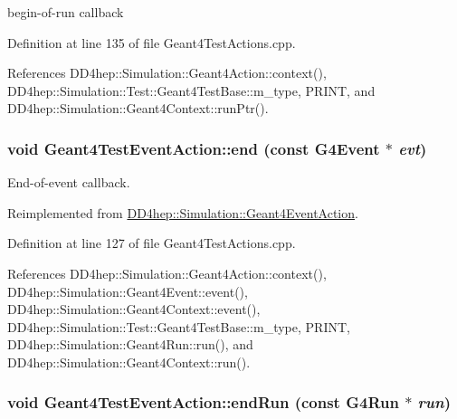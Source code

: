 begin-\/of-\/run callback 

Definition at line 135 of file Geant4TestActions.cpp.

References DD4hep::Simulation::Geant4Action::context(), DD4hep::Simulation::Test::Geant4TestBase::m\_\-type, PRINT, and DD4hep::Simulation::Geant4Context::runPtr().\hypertarget{class_d_d4hep_1_1_simulation_1_1_test_1_1_geant4_test_event_action_a1b436d5b8c7b3f9fa93bc2b04946cad3}{
\subsubsection[{end}]{\setlength{\rightskip}{0pt plus 5cm}void Geant4TestEventAction::end (const G4Event $\ast$ {\em evt})}}
\label{class_d_d4hep_1_1_simulation_1_1_test_1_1_geant4_test_event_action_a1b436d5b8c7b3f9fa93bc2b04946cad3}


End-\/of-\/event callback. 

Reimplemented from \hyperlink{class_d_d4hep_1_1_simulation_1_1_geant4_event_action_af131bad73c28da3419af7c29e0b8c250}{DD4hep::Simulation::Geant4EventAction}.

Definition at line 127 of file Geant4TestActions.cpp.

References DD4hep::Simulation::Geant4Action::context(), DD4hep::Simulation::Geant4Event::event(), DD4hep::Simulation::Geant4Context::event(), DD4hep::Simulation::Test::Geant4TestBase::m\_\-type, PRINT, DD4hep::Simulation::Geant4Run::run(), and DD4hep::Simulation::Geant4Context::run().\hypertarget{class_d_d4hep_1_1_simulation_1_1_test_1_1_geant4_test_event_action_ad5a3426363b043ddd19476871cd4a93c}{
\subsubsection[{endRun}]{\setlength{\rightskip}{0pt plus 5cm}void Geant4TestEventAction::endRun (const G4Run $\ast$ {\em run})}}
\label{class_d_d4hep_1_1_simulation_1_1_test_1_1_geant4_test_event_action_ad5a3426363b043ddd19476871cd4a93c}


